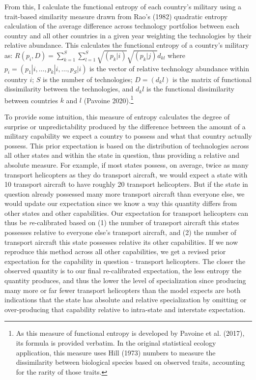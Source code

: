\documentclass[
  12,
  letterpaper,
  DIV=11,
  numbers=noendperiod]{scrartcl}
\begin{document}
From this, I calculate the functional entropy of each country's military
using a trait-based similarity measure drawn from Rao's (1982) quadratic
entropy calculation of the average difference across technology
portfolios between each country and all other countries in a given year
weighting the technologies by their relative abundance. This calculates
the functional entropy of a country's military as:
\(R(p_i,D) = \sum_{k=1}^{S} \sum_{l=1}^{S} \sqrt{(p_k|i)} \sqrt{(p_k|j)} d_{kl}\)
where \(p_i=(p_1|i, …, p_k|i, …, p_S|i)\) is the vector of relative
technology abundance within country \(i\); \(S\) is the number of
technologies; \(D=(d_kl)\) is the matrix of functional dissimilarity
between the technologies, and \(d_kl\) is the functional dissimilarity
between countries \(k\) and \(l\) (Pavoine 2020).\footnote{As this
  measure of functional entropy is developed by Pavoine et al. (2017),
  its formula is provided verbatim. In the original statistical ecology
  application, this measure uses Hill (1973) numbers to measure the
  dissimilarity between biological species based on observed traits,
  accounting for the rarity of those traits.}

To provide some intuition, this measure of entropy calculates the degree
of surprise or unpredictability produced by the difference between the
amount of a military capability we expect a country to possess and what
that country actually possess. This prior expectation is based on the
distribution of technologies across all other states and within the
state in question, thus providing a relative and absolute measure. For
example, if most states possess, on average, twice as many transport
helicopters as they do transport aircraft, we would expect a state with
10 transport aircraft to have roughly 20 transport helicopters. But if
the state in question already possessed many more transport aircraft
than everyone else, we would update our expectation since we know a way
this quantity differs from other states and other capabilities. Our
expectation for transport helicopters can thus be \emph{re}-calibrated
based on (1) the number of transport aircraft this states possesses
relative to everyone else's transport aircraft, and (2) the number of
transport aircraft this state possesses relative its other capabilities.
If we now reproduce this method across all other capabilities, we get a
revised prior expectation for the capability in question - transport
helicopters. The closer the observed quantity is to our final
re-calibrated expectation, the less entropy the quantity produces, and
thus the lower the level of specialization since producing many more or
far fewer transport helicopters than the model expects are both
indications that the state has absolute and relative specialization by
omitting or over-producing that capability relative to intra-state and
interstate expectation.
\end{document}
